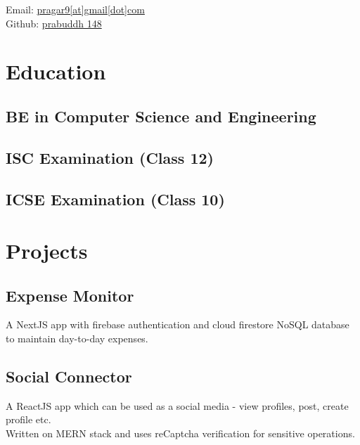 \documentclass[]{deedy-resume-openfont}
\begin{document}
\lastupdated

{
Email: \href{mailto:pragar9@gmail.com}{pragar9[at]gmail[dot]com}\\
Github: \href{https://github.com/prabuddh 148}{prabuddh 148}
}


\begin{minipage}[t]{0.55\textwidth}

	\section{Education}

	\subsection{BE {\small in} Computer Science and Engineering}
	\sectionsep

	\subsection{ISC Examination (Class 12)}
	\sectionsep

	\subsection{ICSE Examination (Class 10)}
	\sectionsep

	\section{Projects}

	\subsection{Expense Monitor}
	A NextJS app with firebase authentication and cloud firestore NoSQL database to maintain day-to-day expenses.
	\sectionsep

	\subsection{Social Connector}
	A ReactJS app which can be used as a social media - view profiles, post, create profile etc.\\
	Written on MERN stack and uses reCaptcha verification for sensitive operations.
	\sectionsep


\end{minipage}
\end{document}
